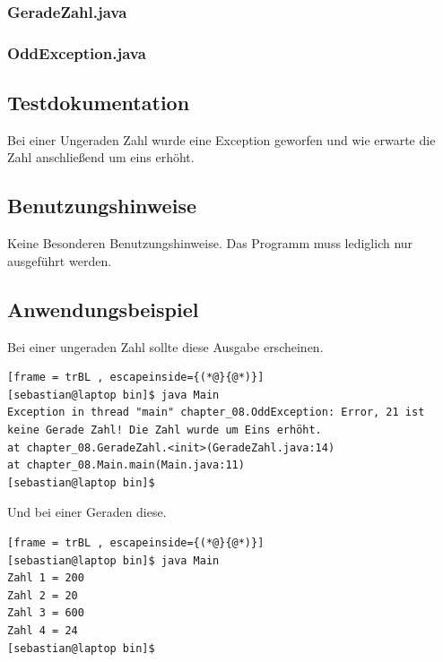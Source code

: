 \subsubsection{GeradeZahl.java}

\subsubsection{OddException.java}


\subsection{Testdokumentation}
Bei einer Ungeraden Zahl wurde eine Exception geworfen und wie erwarte die Zahl
anschlie\ss end um eins erhöht.

\subsection{Benutzungshinweise}
Keine Besonderen Benutzungshinweise.
Das Programm muss lediglich nur ausgeführt werden.

\subsection{Anwendungsbeispiel}
Bei einer ungeraden Zahl sollte diese Ausgabe erscheinen.
\begin{lstlisting}[frame = trBL , escapeinside={(*@}{@*)}]
[sebastian@laptop bin]$ java Main
Exception in thread "main" chapter_08.OddException: Error, 21 ist keine Gerade Zahl! Die Zahl wurde um Eins erhöht.
at chapter_08.GeradeZahl.<init>(GeradeZahl.java:14)
at chapter_08.Main.main(Main.java:11)
[sebastian@laptop bin]$ 
\end{lstlisting}
Und bei einer Geraden diese.
\begin{lstlisting}[frame = trBL , escapeinside={(*@}{@*)}]
[sebastian@laptop bin]$ java Main
Zahl 1 = 200
Zahl 2 = 20
Zahl 3 = 600
Zahl 4 = 24
[sebastian@laptop bin]$ 
\end{lstlisting}